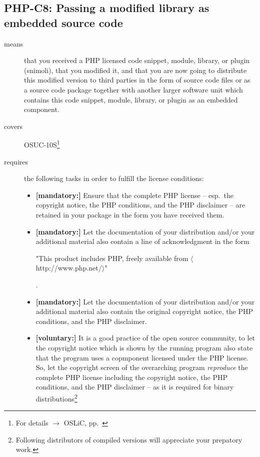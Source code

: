 \subsection{PHP-C8: Passing a modified library as embedded source code}
\label{OSUC-10S-PHP}
\begin{description}
\item[means] that you received a PHP licensed code snippet, module, library,
  or plugin (snimoli), that you modified it, and that you are now going to
  distribute this modified version to third parties in the form of source code
  files or as a source code package together with another larger software unit
  which contains this code snippet, module, library, or plugin as an embedded
  component.

\item[covers] OSUC-10S\footnote{For details $\rightarrow$ OSLiC, pp.\
\pageref{OSUC-10S-DEF}}
\item[requires] the following tasks in order to fulfill the license conditions:
\begin{itemize}
  
  \item \textbf{[mandatory:]} Ensure that the complete PHP license -- esp.\
  the copyright notice, the PHP conditions, and the PHP disclaimer -- are
  retained in your package in the form you have received them.
  
  \item \textbf{[mandatory:]} Let the documentation of your distribution and/or
  your additional material also contain a line of acknowledgment in the form
   \begin{footnotesize}"This product includes PHP, freely available from
  $\langle$http://www.php.net/$\rangle$"\end{footnotesize}.
    
  \item \textbf{[mandatory:]} Let the documentation of your distribution and/or
  your additional material also contain the original copyright notice, the PHP
  conditions, and the PHP disclaimer.

  \item \textbf{[voluntary:]} It is a good practice of the open source
  community, to let the copyright notice which is shown by the running program
  also state that the program uses a copmponent licensed under the PHP license.
  So, let the copyright screen of the overarching program \emph{reproduce} the
  complete PHP license including the copyright notice, the PHP conditions, and
  the PHP disclaimer -- as it is required for binary
  distributions\footnote{Following distributors of compiled versions will
  appreciate your prepatory work.}
  

\end{itemize}
\end{description}
